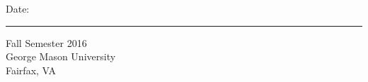         Date: \rule{\datelinelength}{\siglinedepth} \hspace{\spacesiglinename} \!\!Fall Semester 2016 \\
        George Mason University \\
        Fairfax, VA
\newpage
